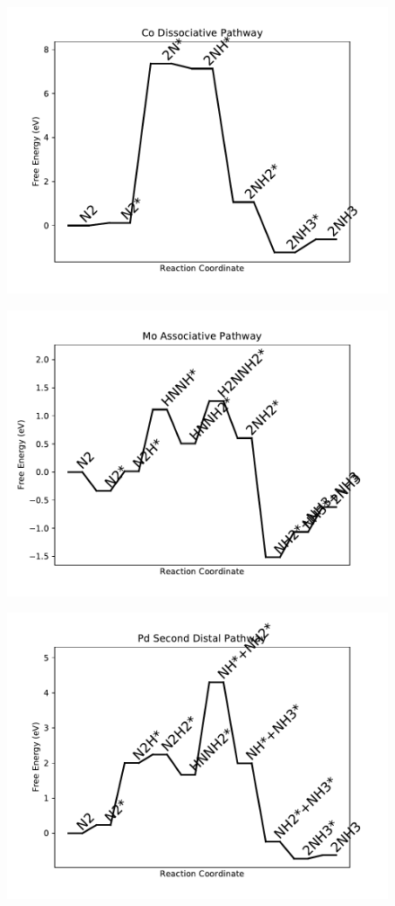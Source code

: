 \begin{figure}
\includegraphics[width=0.8\linewidth]{data/plots/Co_dissociative.pdf}
\end{figure}

\begin{figure}
\includegraphics[width=0.8\linewidth]{data/plots/Mo_associative.pdf}
\end{figure}

\begin{figure}
\includegraphics[width=0.8\linewidth]{data/plots/Pd_distal_2.pdf}
\end{figure}

